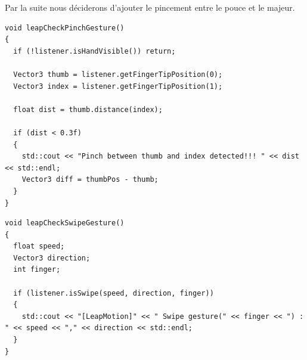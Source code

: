 \documentclass[a4paper,12pt]{article}
\begin{document}
Par la suite nous déciderons d'ajouter le pincement entre le pouce et le majeur.
\begin{lstlisting}
void leapCheckPinchGesture()
{
  if (!listener.isHandVisible()) return;

  Vector3 thumb = listener.getFingerTipPosition(0);
  Vector3 index = listener.getFingerTipPosition(1);
  
  float dist = thumb.distance(index);

  if (dist < 0.3f)
  {
    std::cout << "Pinch between thumb and index detected!!! " << dist << std::endl;
    Vector3 diff = thumbPos - thumb;
  }
}
\end{lstlisting}
\begin{lstlisting}
void leapCheckSwipeGesture()
{
  float speed;
  Vector3 direction;
  int finger;

  if (listener.isSwipe(speed, direction, finger))
  {
    std::cout << "[LeapMotion]" << " Swipe gesture(" << finger << ") : " << speed << "," << direction << std::endl;
  }
}
\end{lstlisting}
\end{document}
